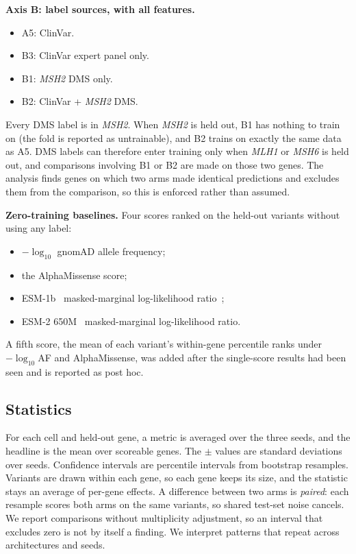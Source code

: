 \documentclass[11pt]{article}
\newcommand{\gene}[1]{\textit{#1}}
\begin{document}
\textbf{Axis B: label sources, with all features.}
\begin{itemize}
\item A5: ClinVar.
\item B3: ClinVar expert panel only.
\item B1: \gene{MSH2} DMS only.
\item B2: ClinVar + \gene{MSH2} DMS.
\end{itemize}
Every DMS label is in \gene{MSH2}. When \gene{MSH2} is held out, B1 has nothing to train
on (the fold is reported as untrainable), and B2 trains on exactly the same data as A5.
DMS labels can therefore enter training only when \gene{MLH1} or \gene{MSH6} is held out,
and comparisons involving B1 or B2 are made on those two genes. The analysis finds genes
on which two arms made identical predictions and excludes them from the comparison, so
this is enforced rather than assumed.

\textbf{Zero-training baselines.} Four scores ranked on the held-out variants without
using any label:
\begin{itemize}
\item $-\log_{10}$ gnomAD allele frequency;
\item the AlphaMissense score;
\item ESM-1b~\citep{rives2021esm} masked-marginal log-likelihood ratio~\citep{meier2021pllr};
\item ESM-2 650M~\citep{lin2023esm2} masked-marginal log-likelihood ratio.
\end{itemize}
A fifth score, the mean of each variant's within-gene percentile ranks under
$-\log_{10}$AF and AlphaMissense, was added after the single-score results had been seen
and is reported as post hoc.

\subsection{Statistics}

For each cell and held-out gene, a metric is averaged over the three seeds, and the
headline is the mean over scoreable genes. The $\pm$ values are standard deviations over
seeds. Confidence intervals are percentile intervals from \nBoot{} bootstrap resamples.
Variants are drawn within each gene, so each gene keeps its size, and the statistic stays
an average of per-gene effects. A difference between two arms is \emph{paired}: each
resample scores both arms on the same variants, so shared test-set noise cancels. We
report \nComparisons{} comparisons without multiplicity adjustment, so an interval that
excludes zero is not by itself a finding. We interpret patterns that repeat across
architectures and seeds.
\end{document}
